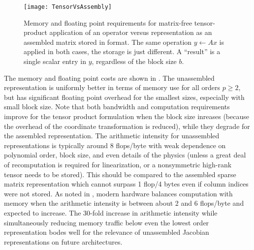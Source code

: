 \begin{figure}
  \centering
  \texttt{[image: TensorVsAssembly]}
  \caption{Memory and floating point requirements for matrix-free tensor-product application of an operator versus representation as an assembled matrix stored in \BAIJ[b] format.
    The same operation $y \gets A x$ is applied in both cases, the storage is just different.
    A ``result'' is a single scalar entry in $y$, regardless of the block size $b$.}\label{fig:tensorasm}
\end{figure}

The memory and floating point costs are shown in .
The unassembled representation is uniformly better in terms of memory use for all orders $p \ge 2$, but has significant floating point overhead for the smallest sizes, especially with small block size.
Note that both bandwidth and computation requirements improve for the tensor product formulation when the block size inreases (because the overhead of the coordinate transformation is reduced), while they degrade for the assembled representation.
The arithmetic intensity for unassembled representations is typically around 8 flops/byte with weak dependence on polynomial order, block size, and even details of the physics (unless a great deal of recomputation is required for linearization, or a nonsymmetric high-rank tensor needs to be stored).
This should be compared to the assembled sparse matrix representation which cannot surpass 1 flop/4 bytes even if column indices were not stored.
As noted in , modern hardware balances computation with memory when the arithmetic intensity is between about 2 and 6 flops/byte and expected to increase.
The 30-fold increase in arithmetic intensity while simultaneously reducing memory traffic below even the lowest order representation bodes well for the relevance of unassembled Jacobian representations on future architectures.
